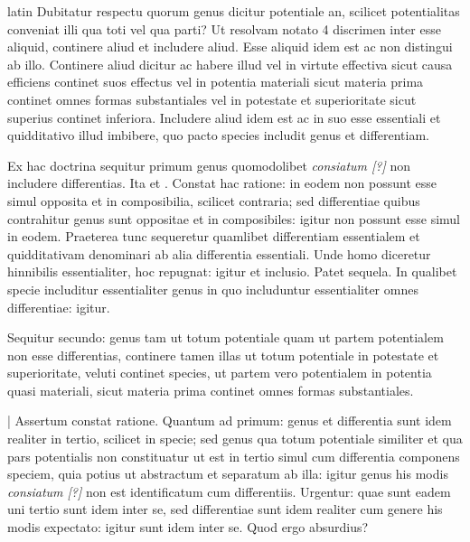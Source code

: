 \begin{otherlanguage*}{latin}
\pstart
Dubitatur respectu quorum genus dicitur potentiale an, scilicet potentialitas conveniat illi qua toti vel qua parti? Ut resolvam notato 4 discrimen inter esse aliquid, continere aliud et includere aliud. Esse aliquid idem est ac non distingui ab illo. Continere aliud dicitur ac habere illud vel in virtute effectiva sicut causa efficiens continet suos effectus vel in potentia materiali sicut materia prima continet omnes formas substantiales vel in potestate et superioritate sicut superius continet inferiora. Includere aliud idem est ac in suo esse essentiali et quidditativo illud imbibere, quo pacto species includit genus et differentiam. 
\pend

\pstart
Ex hac doctrina sequitur primum genus quomodolibet \emph{consiatum [?]} non includere differentias. Ita  et . Constat hac ratione:
in eodem non possunt esse simul opposita et in composibilia, scilicet contraria; sed differentiae quibus contrahitur genus sunt oppositae et in composibiles:
igitur non possunt esse simul in eodem. Praeterea tunc sequeretur quamlibet differentiam essentialem et quidditativam denominari ab alia differentia essentiali. Unde homo diceretur hinnibilis essentialiter, hoc repugnat:
igitur et inclusio. Patet sequela. In qualibet specie includitur essentialiter genus in quo includuntur essentialiter omnes differentiae:
igitur. 
\pend

\pstart
Sequitur secundo:
genus tam ut totum potentiale quam ut partem potentialem non esse differentias, continere tamen illas ut totum potentiale in potestate et superioritate, veluti continet species, ut partem vero potentialem in potentia quasi materiali, sicut materia prima continet omnes formas substantiales. 
\pend

\pstart
\textnormal{|} Assertum constat ratione. Quantum ad primum:
genus et differentia sunt idem realiter in tertio, scilicet in specie; sed genus qua totum potentiale similiter et qua pars potentialis non constituatur ut est in tertio simul cum differentia componens speciem, quia potius ut abstractum et separatum ab illa:
igitur genus his modis \emph{consiatum [?]} non est identificatum cum differentiis. Urgentur:
quae sunt eadem uni tertio sunt idem inter se, sed differentiae sunt idem realiter cum genere his modis expectato:
igitur sunt idem inter se. Quod ergo absurdius? 
\pend


\end{otherlanguage*}
